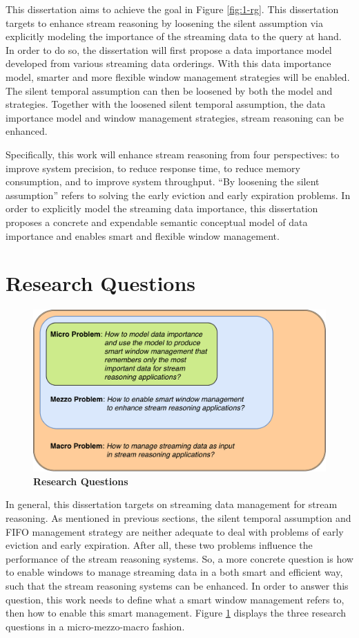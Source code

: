This dissertation aims to achieve the goal in Figure \ref{fig:1-rg}.
This dissertation targets to enhance stream reasoning by loosening the silent assumption via explicitly modeling the importance of the streaming data to the query at hand.
In order to do so, the dissertation will first propose a data importance model developed from various streaming data orderings. 
With this data importance model, smarter and more flexible window management strategies will be enabled. 
The silent temporal assumption can then be loosened by both the model and strategies.
Together with the loosened silent temporal assumption, the data importance model and window management strategies, stream reasoning can be enhanced. 

Specifically, this work will enhance stream reasoning from four perspectives: to improve system precision, to reduce response time, to reduce memory consumption, and to improve system throughput. 
``By loosening the silent assumption'' refers to solving the early eviction and early expiration problems. 
In order to explicitly model the streaming data importance, this dissertation proposes a concrete and expendable semantic conceptual model of data importance and enables smart and flexible window management. 
%
\section{Research Questions}

\begin{figure}[!htbp]
	\centering
	\includegraphics[width=5in]{img/1-rq.pdf}
	\caption{\textbf{Research Questions}}
	\label{fig:1-rq} 
\end{figure}

In general, this dissertation targets on streaming data management for stream reasoning. 
As mentioned in previous sections, the silent temporal assumption and FIFO management strategy are neither adequate to deal with problems of early eviction and early expiration. 
After all, these two problems influence the performance of the stream reasoning systems. 
So, a more concrete question is how to enable windows to manage streaming data in a both smart and efficient way, such that the stream reasoning systems can be enhanced. 
In order to answer this question, this work needs to define what a smart window management refers to, then how to enable this smart management. 
Figure \ref{fig:1-rq} displays the three research questions in a micro-mezzo-macro \cite{lacasse2015making} fashion.

